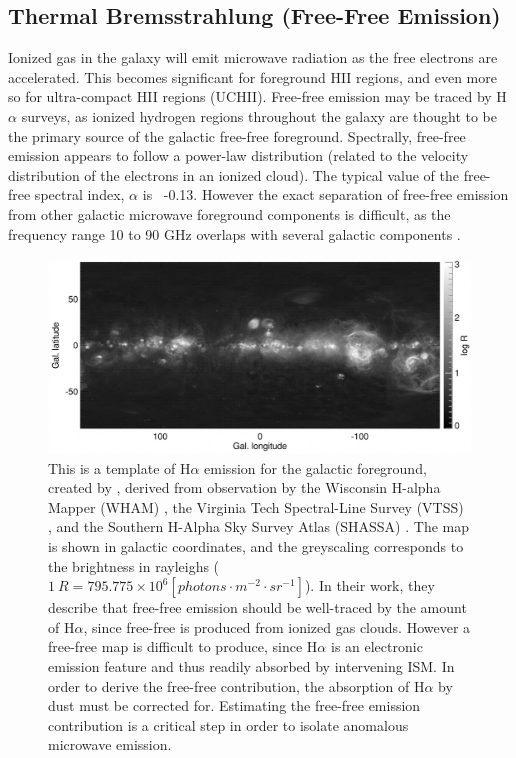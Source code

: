 \subsection{Thermal Bremsstrahlung (Free-Free Emission)}
     Ionized gas in the galaxy will emit microwave radiation as the free electrons are accelerated. This becomes significant for foreground HII regions, and even more so for ultra-compact HII regions (UCHII). Free-free emission may be traced by H$\alpha$ surveys, as ionized hydrogen regions throughout the galaxy are thought to be the primary source of the galactic free-free foreground. Spectrally, free-free emission appears to follow a power-law distribution (related to the velocity distribution of the electrons in an ionized cloud). The typical value of the free-free spectral index, $\alpha$ is ~-0.13. However the exact separation of free-free emission from other galactic microwave foreground components is difficult, as the  frequency range 10 to 90 GHz overlaps with several galactic components \citep{wmap03b, leach08, planckXII}.
\begin{figure}[htb!]
\begin{center}
\includegraphics[width=150mm]{EPS/finkbeiner03_fg4_halpha.pdf}
\caption{
This is a template of H$\alpha$ emission for the galactic foreground, created by \cite{finkbeiner03}, derived from observation by the Wisconsin H-alpha Mapper (WHAM) \citep{wham98}, the Virginia Tech Spectral-Line Survey (VTSS) \citep{dennison98}, and the Southern H-Alpha Sky Survey Atlas (SHASSA) \citep{gaustad01}. The map is shown in galactic coordinates, and the greyscaling corresponds to the brightness in rayleighs ($1~R = 795.775\times10^6 [photons·m^{-2}·sr^{-1}]$). In their work, they describe that free-free emission should be well-traced by the amount of H$\alpha$, since free-free is produced from ionized gas clouds. However a free-free map is difficult to produce, since H$\alpha$ is an electronic emission feature and thus readily absorbed by intervening ISM. In order to derive the free-free contribution, the absorption of H$\alpha$ by dust must be corrected for. Estimating the free-free emission contribution is a critical step in order to isolate anomalous microwave emission.  
 }
\label{Dust}
\end{center}
\end{figure}

